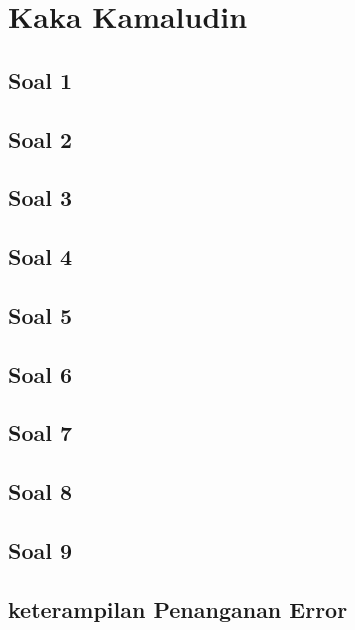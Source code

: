 \section{Kaka Kamaludin}
\subsection{Soal 1}

\subsection{Soal 2}

\subsection{Soal 3}

\subsection{Soal 4}

\subsection{Soal 5}

\subsection{Soal 6}

\subsection{Soal 7}

\subsection{Soal 8}

\subsection{Soal 9}

\subsection{keterampilan Penanganan Error}

